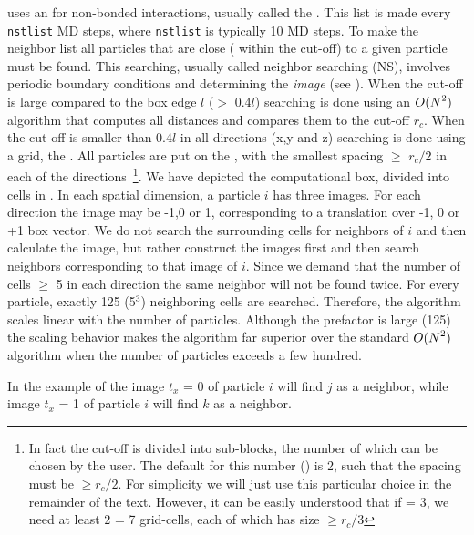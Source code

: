 {\gromacs} uses an  for non-bonded
interactions, usually called the {\em {}}.
This list is made every {\tt nstlist} MD steps, where {\tt nstlist} is
typically 10 MD steps.  To make the neighbor list all particles that
are close ({\ie} within the cut-off) to a given particle must be
found.  This searching, usually called neighbor searching (NS),
involves periodic boundary conditions and determining the {\em image}
(see ).  When the cut-off is large compared to the box
edge $l$ ($>$ 0.4$l$) searching is done using an $O({\mbox{$N$}}^2)$
algorithm that computes all distances and compares them to the cut-off
$r_c$.  When the cut-off is smaller than 0.4$l$ in all directions (x,y
and z) searching is done using a grid, the {\nsgrid}. All particles
are put on the {\nsgrid}, with the smallest spacing $\ge$ $r_c/2$ in
each of the
directions~\footnote{In fact the cut-off is divided into sub-blocks,
the number of which can be chosen by the user. The default for this
number (\dgrid) is 2, such that the {\nsgrid} spacing must be $\ge
r_c/2$. For simplicity we will just use this particular choice in the
remainder of the text. However, it can be easily understood that if
{\dgrid} = 3, we need at least 2{\dgrid} = 7 grid-cells, each of which
has size $\ge r_c/3$}.  We have depicted the computational box,
divided into {\nsgrid} cells in
.
In each spatial dimension, a particle $i$ has three images. For each
direction the image may be -1,0 or 1, corresponding to a translation
over -1, 0 or +1 box vector. We do not search the surrounding
{\nsgrid} cells for neighbors of $i$ and then calculate the image, but
rather construct the images first and then search neighbors
corresponding to that image of $i$.  Since we demand that the number
of {\nsgrid} cells $\ge$ 5 in each direction the same neighbor will
not be found twice. For every particle, exactly 125 (5$^3$)
neighboring cells are searched. Therefore, the algorithm scales linear
with the number of particles. Although the prefactor is large (125)
the scaling behavior makes the algorithm far superior over the
standard $O({\mbox{$N$}}^2)$ algorithm when the number of particles
exceeds a few hundred.

In the example of  the image $t_x$ = 0 of particle
$i$ will find $j$ as a neighbor, while image $t_x$ = 1 of particle $i$
will find $k$ as a neighbor.

